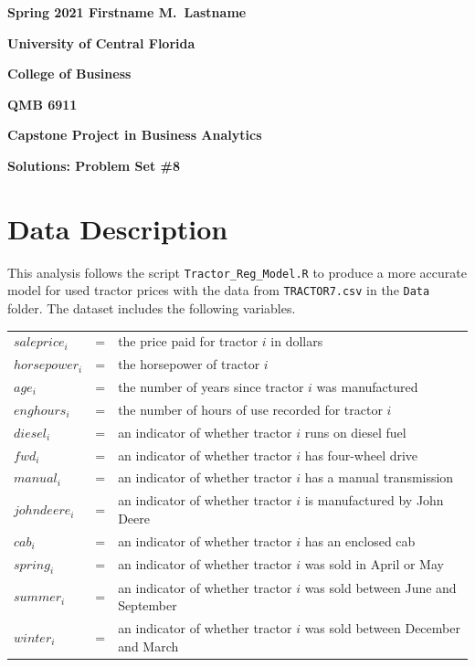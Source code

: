 \documentclass[11pt]{paper}
\begin{document}

\pagestyle{empty}
{\noindent\bf Spring 2021 \hfill Firstname M.~Lastname}
\vskip 16pt
\centerline{\bf University of Central Florida}
\centerline{\bf College of Business}
\vskip 16pt
\centerline{\bf QMB 6911}
\centerline{\bf Capstone Project in Business Analytics}
\vskip 10pt
\centerline{\bf Solutions:  Problem Set \#8}
\vskip 32pt
\noindent
% 
\section{Data Description}

This analysis follows the script \texttt{Tractor\_Reg\_Model.R} to produce a more accurate model for used tractor prices with the data from \texttt{TRACTOR7.csv} in the \texttt{Data} folder. 
The dataset includes the following variables.
\begin{table}[h!]
\begin{tabular}{l l l}

$saleprice_i$ & = & the price paid for tractor $i$ in dollars \\
% 
$horsepower_i$ & = & the horsepower of tractor $i$ \\
$age_i$ & = & the number of years since tractor $i$ was manufactured  \\
$enghours_i$ & = & the number of hours of use recorded for tractor $i$  \\
$diesel_i$ & = & an indicator of whether tractor $i$ runs on diesel fuel \\ %
$fwd_i$ & = & an indicator of whether tractor $i$ has four-wheel drive \\ %
$manual_i$ & = & an indicator of whether tractor $i$ has a manual transmission \\ %
$johndeere_i$ & = & an indicator of whether tractor $i$ is manufactured by John Deere \\ %
$cab_i$ & = & an indicator of whether tractor $i$ has an enclosed cab \\ %
% 
$spring_i$ & = & an indicator of whether tractor $i$ was sold in April or May \\ %
$summer_i$ & = & an indicator of whether tractor $i$ was sold between June and September \\ %
$winter_i$ & = & an indicator of whether tractor $i$ was sold between December and March \\ %

\end{tabular}
\end{table}
%
\end{document}
